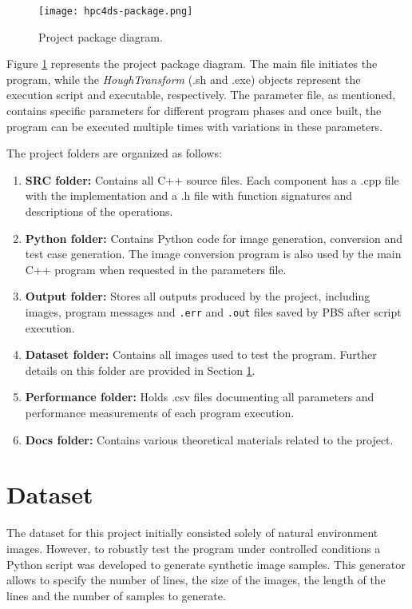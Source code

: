 \documentclass[conference]{IEEEtran}
\begin{document}
    \begin{figure}[htbp]
        \centering
        \texttt{[image: hpc4ds-package.png]}
        \caption{Project package diagram.}
        \label{fig:pkg}
    \end{figure}
    
    Figure \ref{fig:pkg} represents the project package diagram. The main file initiates the program, while the \textit{HoughTransform} (.sh and .exe) objects represent the execution script and executable, respectively. The parameter file, as mentioned, contains specific parameters for different program phases and once built, the program can be executed multiple times with variations in these parameters.
    
    The project folders are organized as follows:
    \begin{enumerate}
        \item \textbf{SRC folder:} Contains all C++ source files. Each component has a .cpp file with the implementation and a .h file with function signatures and descriptions of the operations.
        \item \textbf{Python folder:} Contains Python code for image generation, conversion and test case generation. The image conversion program is also used by the main C++ program when requested in the parameters file.
        \item \textbf{Output folder:} Stores all outputs produced by the project, including images, program messages and \texttt{.err} and \texttt{.out} files saved by PBS after script execution.
        \item \textbf{Dataset folder:} Contains all images used to test the program. Further details on this folder are provided in Section \ref{sec:dataset}.
        \item \textbf{Performance folder:} Holds .csv files documenting all parameters and performance measurements of each program execution.
        \item \textbf{Docs folder:} Contains various theoretical materials related to the project.
    \end{enumerate}

\section{Dataset}
\label{sec:dataset}

    The dataset for this project initially consisted solely of natural environment images. However, to robustly test the program under controlled conditions a Python script was developed to generate synthetic image samples. This generator allows to specify the number of lines, the size of the images, the length of the lines and the number of samples to generate.
    
\end{document}
